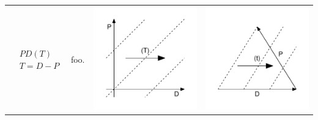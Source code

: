 \documentclass[
  12pt
]{scrartcl}
\begin{document}
\begin{center}
\begin{longtable}{m{}m{}m{}m{}}
  \midrule
  $$\begin{aligned}
    &PD(T) \\
    &T = D - P
  \end{aligned}$$ &
  foo. &
  \includegraphics[width = \linewidth]{../fig/PDt.pdf} &
  \includegraphics[width = \linewidth]{../fig/PDt_iso.pdf}  \\

\end{longtable}
\end{center}
\end{document}
